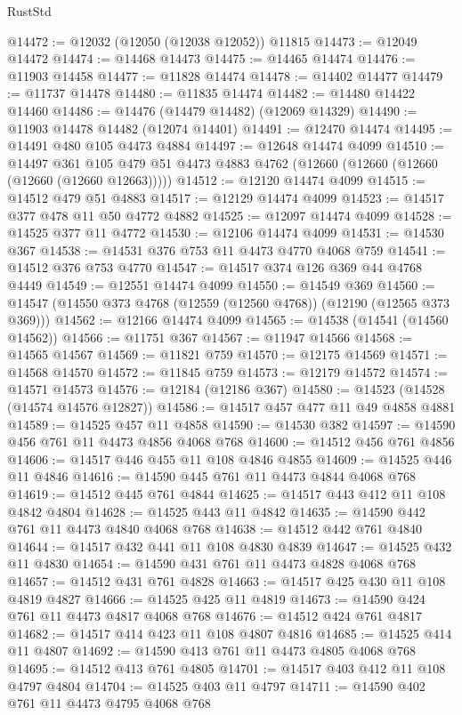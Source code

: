 \begin{lexlean}{RustStd}
\begin{coremodule}
@14472 := @12032 (@12050 (@12038 @12052)) @11815
@14473 := @12049 @14472
@14474 := @14468 @14473
@14475 := @14465 @14474
@14476 := @11903 @14458
@14477 := @11828 @14474
@14478 := @14402 @14477
@14479 := @11737 @14478
@14480 := @11835 @14474
@14482 := @14480 @14422 @14460
@14486 := @14476 (@14479 @14482) (@12069 @14329)
@14490 := @11903 @14478 @14482 (@12074 @14401)
@14491 := @12470 @14474
@14495 := @14491 @480 @105 @4473 @4884
@14497 := @12648 @14474 @4099
@14510 := @14497
    @361
    @105
    @479
    @51
    @4473
    @4883
    @4762
    (@12660 (@12660 (@12660 (@12660 (@12660 @12663)))))
@14512 := @12120 @14474 @4099
@14515 := @14512 @479 @51 @4883
@14517 := @12129 @14474 @4099
@14523 := @14517 @377 @478 @11 @50 @4772 @4882
@14525 := @12097 @14474 @4099
@14528 := @14525 @377 @11 @4772
@14530 := @12106 @14474 @4099
@14531 := @14530 @367
@14538 := @14531 @376 @753 @11 @4473 @4770 @4068 @759
@14541 := @14512 @376 @753 @4770
@14547 := @14517 @374 @126 @369 @44 @4768 @4449
@14549 := @12551 @14474 @4099
@14550 := @14549 @369
@14560 := @14547 (@14550 @373 @4768 (@12559 (@12560 @4768)) (@12190 (@12565 @373 @369)))
@14562 := @12166 @14474 @4099
@14565 := @14538 (@14541 (@14560 @14562))
@14566 := @11751 @367
@14567 := @11947 @14566
@14568 := @14565 @14567
@14569 := @11821 @759
@14570 := @12175 @14569
@14571 := @14568 @14570
@14572 := @11845 @759
@14573 := @12179 @14572
@14574 := @14571 @14573
@14576 := @12184 (@12186 @367)
@14580 := @14523 (@14528 (@14574 @14576 @12827))
@14586 := @14517 @457 @477 @11 @49 @4858 @4881
@14589 := @14525 @457 @11 @4858
@14590 := @14530 @382
@14597 := @14590 @456 @761 @11 @4473 @4856 @4068 @768
@14600 := @14512 @456 @761 @4856
@14606 := @14517 @446 @455 @11 @108 @4846 @4855
@14609 := @14525 @446 @11 @4846
@14616 := @14590 @445 @761 @11 @4473 @4844 @4068 @768
@14619 := @14512 @445 @761 @4844
@14625 := @14517 @443 @412 @11 @108 @4842 @4804
@14628 := @14525 @443 @11 @4842
@14635 := @14590 @442 @761 @11 @4473 @4840 @4068 @768
@14638 := @14512 @442 @761 @4840
@14644 := @14517 @432 @441 @11 @108 @4830 @4839
@14647 := @14525 @432 @11 @4830
@14654 := @14590 @431 @761 @11 @4473 @4828 @4068 @768
@14657 := @14512 @431 @761 @4828
@14663 := @14517 @425 @430 @11 @108 @4819 @4827
@14666 := @14525 @425 @11 @4819
@14673 := @14590 @424 @761 @11 @4473 @4817 @4068 @768
@14676 := @14512 @424 @761 @4817
@14682 := @14517 @414 @423 @11 @108 @4807 @4816
@14685 := @14525 @414 @11 @4807
@14692 := @14590 @413 @761 @11 @4473 @4805 @4068 @768
@14695 := @14512 @413 @761 @4805
@14701 := @14517 @403 @412 @11 @108 @4797 @4804
@14704 := @14525 @403 @11 @4797
@14711 := @14590 @402 @761 @11 @4473 @4795 @4068 @768

\end{coremodule}
\end{lexlean}
